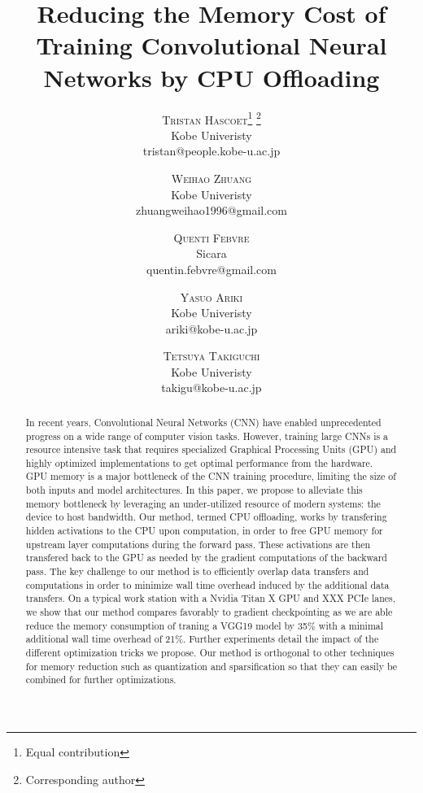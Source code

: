 \documentclass[11pt,onecolumn]{article}
\title{Reducing the Memory Cost of Training Convolutional Neural Networks by CPU Offloading} %
\author{%
	\textsc{Tristan Hascoet}\thanks{Equal contribution} \thanks{Corresponding author} \\ %
	\normalsize Kobe Univeristy \\ %
	\normalsize tristan@people.kobe-u.ac.jp %
	\and %
	\textsc{Weihao Zhuang}\footnotemark[1] \\ %
	\normalsize Kobe Univeristy \\ %
	\normalsize zhuangweihao1996@gmail.com %
	\and %
	\textsc{Quenti Febvre} \\ %
    \normalsize Sicara \\ %
    \normalsize quentin.febvre@gmail.com  %
    \and %
    \textsc{Yasuo Ariki} \\ %
    \normalsize Kobe Univeristy \\ %
	\normalsize ariki@kobe-u.ac.jp %
	\and %
    \textsc{Tetsuya Takiguchi} \\ %
    \normalsize Kobe Univeristy \\ %
	\normalsize takigu@kobe-u.ac.jp %
}
\date{\vspace{-1ex}}
\begin{document}
	
\maketitle
	
\begin{abstract}

In recent years, Convolutional Neural Networks (CNN) have enabled 
unprecedented progress on a wide range of computer vision tasks. 
However, training large CNNs is a resource intensive task that requires 
specialized Graphical Processing Units (GPU) and highly optimized 
implementations to get optimal performance from the hardware. 
GPU memory is a major bottleneck of the CNN training procedure,
 limiting  the size of both inputs and model architectures.
In this paper, we propose to alleviate this memory bottleneck by 
leveraging an under-utilized resource of modern systems: 
the device to host bandwidth.
Our method, termed CPU offloading, works by transfering hidden activations to the CPU upon
computation, in order to free GPU memory for upstream layer computations during the forward pass. 
These activations are then transfered back to the GPU as needed by the gradient computations of the backward pass.
The key challenge to our method is to efficiently overlap data transfers and computations
in order to minimize  wall time overhead induced by the additional data transfers.
On a typical work station with a Nvidia Titan X GPU and XXX PCIe lanes, 
we show that our method compares favorably to 
gradient checkpointing as we are able reduce the memory consumption of traning a VGG19 model by 35\% with a minimal additional wall time overhead of 21\%. 
Further experiments detail the impact of the different optimization tricks we propose.
Our method is orthogonal to other techniques for memory reduction such as 
quantization and sparsification so that they can easily be combined for further optimizations.

\end{abstract}
\end{document}
